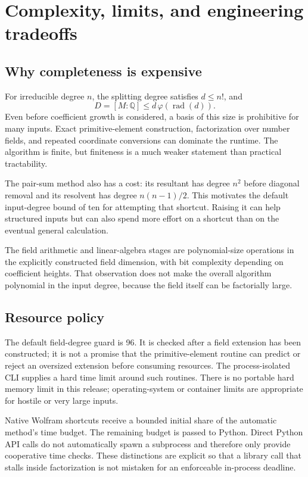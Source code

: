 \documentclass[11pt,a4paper]{article}
\newcommand{\Q}{\mathbb Q}
\newcommand{\rad}{\operatorname{rad}}
\theoremstyle{definition}
\theoremstyle{remark}
\begin{document}
\section{Complexity, limits, and engineering tradeoffs}\label{sec:limits}

\subsection{Why completeness is expensive}

For irreducible degree $n$, the splitting degree satisfies $d\le n!$, and
\[
 D=[M:\Q]\le d\,\varphi(\rad(d)).
\]
Even before coefficient growth is considered, a basis of this size is prohibitive for many inputs. Exact primitive-element construction, factorization over number fields, and repeated coordinate conversions can dominate the runtime. The algorithm is finite, but finiteness is a much weaker statement than practical tractability.

The pair-sum method also has a cost: its resultant has degree $n^2$ before diagonal removal and its resolvent has degree $n(n-1)/2$. This motivates the default input-degree bound of ten for attempting that shortcut. Raising it can help structured inputs but can also spend more effort on a shortcut than on the eventual general calculation.

The field arithmetic and linear-algebra stages are polynomial-size operations in the explicitly constructed field dimension, with bit complexity depending on coefficient heights. That observation does not make the overall algorithm polynomial in the input degree, because the field itself can be factorially large.

\subsection{Resource policy}

The default field-degree guard is 96. It is checked after a field extension has been constructed; it is not a promise that the primitive-element routine can predict or reject an oversized extension before consuming resources. The process-isolated CLI supplies a hard time limit around such routines. There is no portable hard memory limit in this release; operating-system or container limits are appropriate for hostile or very large inputs.

Native Wolfram shortcuts receive a bounded initial share of the automatic method's time budget. The remaining budget is passed to Python. Direct Python API calls do not automatically spawn a subprocess and therefore only provide cooperative time checks. These distinctions are explicit so that a library call that stalls inside factorization is not mistaken for an enforceable in-process deadline.
\end{document}
